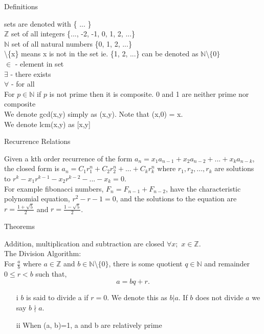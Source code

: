 \documentclass[12pt]{article}
\def \z{\mathbb{Z}}
\def \n{\mathbb{N}}
\def \no{\noindent}
\begin{document}
\begin{center} Definitions \end{center}

\no sets are denoted with \{ ... \}\\

\no $\z$ set of all integers \{..., -2, -1, 0, 1, 2, ...\}\\

\no $\n$ set of all natural numbers \{0, 1, 2, ...\}\\

\no \textbackslash \{x\} means x is not in the set ie. \{1, 2, ...\} can be denoted as $\n$\textbackslash$\{0\}$\\

\no $\in$ - element in set\\

\no $\exists$ - there exists\\

\no $\forall$ - for all\\

\no For $p \in \n$ if $p$ is not prime then it is composite. 0 and 1 are neither prime nor composite\\

\no We denote gcd(x,y) simply as (x,y). Note that (x,0) = x.\\

\no We denote lcm(x,y) as [x,y]

\begin{center} Recurrence Relations \end{center}

Given a kth order recurrence of the form $a_n=x_1a_{n-1}+x_2a_{n-2}+...+x_ka_{n-k}$, the closed form is $a_n = C_1r_1^n+C_2r_2^n+...+C_kr_k^n$ where $r_1,r_2,...,r_k$ are solutions to $r^k-x_1r^{k-1}-x_2r^{k-2}-...-x_k=0$.\\

For example fibonacci numbers, $F_n = F_{n-1} + F_{n-2}$, have the characteristic polynomial equation, $r^2 -r -1 = 0$, and the solutions to the equation are $r=\frac{1+\sqrt{5}}2$ and $r=\frac{1-\sqrt{5}}2$.

\begin{center} Theorems \end{center}

\no Addition, multiplication and subtraction are closed $\forall x;$ $x \in \z$.\\

\no  The Division Algorithm:\\
\hangindent=1cm For $\frac ab$ where $a \in \z$ and $b \in \n$\textbackslash$\{0\}$, there is some quotient $q \in \n$ and remainder $0 \leq r < b$ such that, \[ a = bq + r.\]
 \begin{itemize}
	\item[i] $b$ is said to divide a if $r=0$. We denote this as $b|a$. If $b$ does not divide $a$ we say $b \nmid a$.
	\item[ii] When (a, b)=1, a and b are relatively prime\\
\end{itemize}
\end{document}
